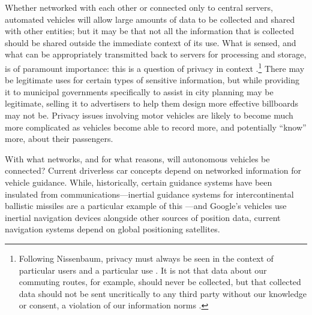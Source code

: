 Whether networked with each other or connected only to central
servers, automated vehicles will allow large amounts of data to be collected
and shared with other entities; but it may be that not all the
information that is collected should be shared outside the immediate
context of its use. What is sensed, and what can be appropriately
transmitted back to servers for processing and storage, is of
paramount importance: this is a question of privacy in context
\cite{nissenbaum}.\footnote{Following Nissenbaum, privacy must always
  be seen in the context of 
particular users and a particular use \cite[p. 2]{nissenbaum}. It is not that data about our
commuting routes, for example, should never be collected, but that collected data
should not be sent uncritically to any third party without our
knowledge or consent, a violation of our information norms \cite[p.
  3]{nissenbaum}.}
There
may be legitimate uses for certain types of sensitive information, but
while providing it to municipal governments specifically to assist in
city planning may be legitimate, selling it to advertisers to help
them design more effective billboards may not be. Privacy issues
involving motor vehicles are likely to become much more complicated as
vehicles become able to record more, and potentially ``know'' more,
about their passengers.



With what networks, and for what reasons, will autonomous vehicles be
connected? Current driverless car concepts depend on networked
information for vehicle guidance. While, historically, certain
guidance systems have been insulated from communications---inertial
guidance systems for intercontinental ballistic
missiles are a particular example of this \cite{mackenzie}---and
Google's vehicles use inertial navigation devices \cite{knightFurther}
alongside other sources of position data, current navigation systems
depend on global positioning satellites. %

